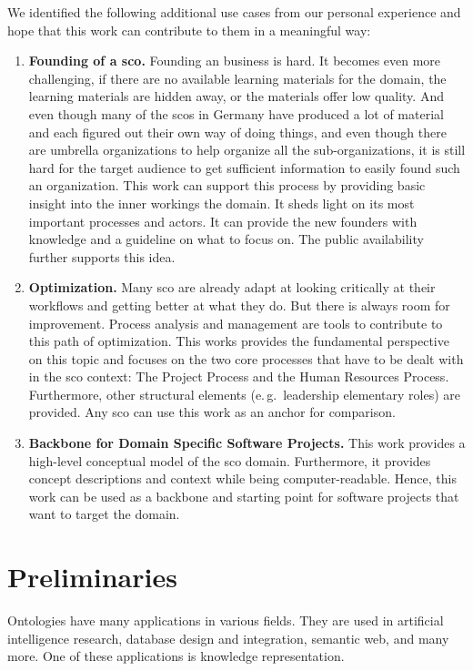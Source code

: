 \documentclass[a4paper, DIV=13, BCOR=0cm]{scrbook}
\newcommand{\eg}{e.\,g.\ }
\begin{document}
We identified the following additional use cases from our personal experience and hope that this work can contribute to them in a meaningful way:

\begin{enumerate}
	\item \textbf{Founding of a \gls{sco}.} Founding an business is hard. It becomes even more challenging, if there are no available learning materials for the domain, the learning materials are hidden away, or the materials offer low quality. And even though many of the \glspl{sco} in Germany have produced a lot of material and each figured out their own way of doing things, and even though there are umbrella organizations to help organize all the sub-organizations, it is still hard for the target audience to get sufficient information to easily found such an organization. This work can support this process by providing basic insight into the inner workings the domain. It sheds light on its most important processes and actors. It can provide the new founders with knowledge and a guideline on what to focus on. The public availability further supports this idea.
	\item \textbf{Optimization.} Many \gls{sco} are already adapt at looking critically at their workflows and getting better at what they do. But there is always room for improvement. Process analysis and management are tools to contribute to this path of optimization. This works provides the fundamental perspective on this topic and focuses on the two core processes that have to be dealt with in the \gls{sco} context: The Project Process and the Human Resources Process. Furthermore, other structural elements (\eg leadership elementary roles) are provided. Any \gls{sco} can use this work as an anchor for comparison.
	\item \textbf{Backbone for Domain Specific Software Projects.} This work provides a high-level conceptual model of the \gls{sco} domain. Furthermore, it provides concept descriptions and context while being computer-readable. Hence, this work can be used as a backbone and starting point for software projects that want to target the domain.
\end{enumerate}

\chapter[Preliminaries \\\textcolor{gray}{
	{\footnotesize \textsl{Gives the background of this work and prepares for the subsequent elucidation.}}
}]{Preliminaries}
Ontologies have many applications in various fields. They are used in artificial intelligence research, database design and integration, semantic web, and many more. \cite[p.\,1]{Gomez-Perez:2004aa} One of these applications is knowledge representation.
\end{document}
